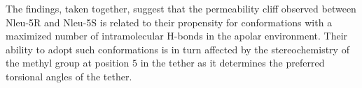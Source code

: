 \begin{table}[]
\centering
\caption{ Hydrogen bond occurrence in percentage for the sampled conformations in 
water  for  Nleu-5R,  Nleu-5S,  Nleu-2R,  and  Nleu-2S.  The  analysis  was  restricted  to  the 
clusters with the trans-peptoid bond.}
\label{tab: SIhbondRatios}
\end{table}


The findings, taken together, suggest that the permeability cliff observed between Nleu-5R and Nleu-5S is related to their propensity for conformations with a maximized number of intramolecular H-bonds in the apolar environment. Their ability to adopt such conformations is in turn affected by the stereochemistry of the methyl group at position $5$ in the tether as it determines the preferred torsional angles of the tether.

